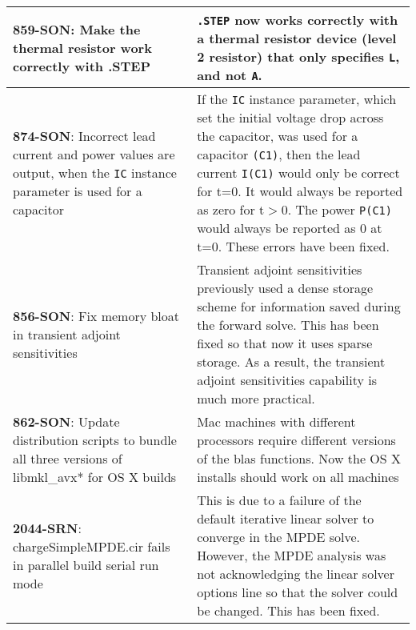 {\begin{longtable}[h] {>{\raggedright\small}m{2in}|>{\raggedright\let\\\tabularnewline\small}m{3.5in}}
     \textbf{859-SON}: Make the thermal resistor work correctly with .STEP & 
     \texttt{.STEP} now works correctly with a thermal resistor device (level
     2 resistor) that only specifies \texttt{L}, and not \texttt{A}. \\ \hline

     \textbf{874-SON}: Incorrect lead current and power values are output, when 
     the \texttt{IC} instance parameter is used for a capacitor & If the \texttt{IC}
     instance parameter, which set the initial voltage drop across the capacitor,
     was used for a capacitor \texttt{(C1)}, then the lead current \texttt{I(C1)}
     would only be correct for t=0.  It would always be reported as zero for t$>$0.  
     The power \texttt{P(C1)} would always be reported as 0 at t=0.  These errors
     have been fixed.  \\ \hline

     \textbf{856-SON}: Fix memory bloat in transient adjoint sensitivities & 
     Transient adjoint sensitivities previously used a dense storage scheme for
     information saved during the forward solve.  This has been fixed so that
     now it uses sparse storage.  As a result, the transient adjoint
     sensitivities  capability is much more practical.  \\ \hline

     \textbf{862-SON}: Update distribution scripts to bundle all three versions
     of libmkl\_avx* for OS X builds & 
     Mac machines with different processors require different versions of the
     blas functions. Now the OS X installs should work on all machines \\
     \hline

     \textbf{2044-SRN}: chargeSimpleMPDE.cir fails in parallel build serial run mode &
     This is due to a failure of the default iterative linear solver to converge in the MPDE solve.
     However, the MPDE analysis was not acknowledging the linear solver options line
     so that the solver could be changed.  This has been fixed. \\ \hline

\end{longtable}
}
